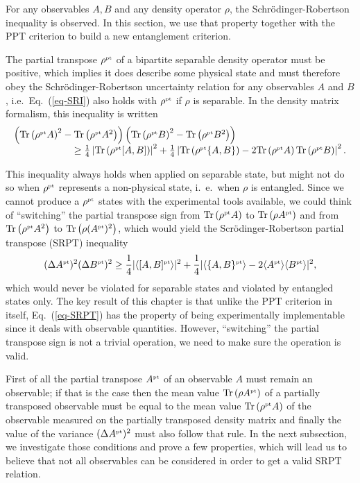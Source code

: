 For any observables $A, B$ and any density operator $\rho$, the Schr\"odinger-Robertson inequality is observed. In this section, we use that property together with the PPT criterion to build a new entanglement criterion.

The partial transpose $\rho^{\mbox{\tiny \textup{pt}}}$ of a bipartite separable density operator must be positive, which implies it does describe some physical state and must therefore obey the Schr\"odinger-Robertson uncertainty relation for any observables $A$ and $B$, i.e.~Eq.~(\ref{eq-SRI}) also holds with $\rho^{\mbox{\tiny \textup{pt}}}$ if $\rho$ is separable. In the density matrix formalism, this inequality is written
\[ \begin{array}{c}
    \left( \tr{\pt \rho A}^2 - \tr{\pt \rho A^2} \right) \left( \tr{\pt \rho B}^2 - \tr{\pt \rho B^2} \right)  \hspace{4cm} \\  \hfill \ge \frac 1 4 \left| \tr{\pt\rho [A,B]} \right|^2+\frac 1 4 \left| \tr{\pt\rho \{A,B\}} - 2  \tr{\pt \rho A} \tr{\pt \rho B}\right|^2.
  \end{array}\]

This inequality always holds when applied on separable state, but might not do so when $\rho^{\mbox{\tiny \textup{pt}}}$ represents a non-physical state, i.~e.~when $\rho$ is entangled. Since we cannot produce a $\rho^{\mbox{\tiny \textup{pt}}}$ states with the experimental tools available, we could think of ``switching'' the partial transpose sign from $ \mbox{\textup{Tr}}\left( \rho^{\mbox{\tiny \textup{pt}}} A \right)$ to $ \mbox{\textup{Tr}}\left(  \rho A^{\mbox{\tiny \textup{pt}}} \right)$ and from $\mbox{\textup{Tr}}\left( \rho^{\mbox{\tiny \textup{pt}}} A^2 \right)$ to $\mbox{\textup{Tr}}\left(  \rho (A^{\mbox{\tiny \textup{pt}}})^2 \right)$, which would yield the Scr\"odinger-Robertson partial transpose (SRPT) inequality
\[  (\Delta A^{\mbox{\tiny \textup{pt}}})^2 (\Delta B^{\mbox{\tiny \textup{pt}}})^2 \ge \frac{1}{4} | \langle [A,B]^{\mbox{\tiny \textup{pt}}} \rangle |^2  +  \frac{1}{4} | \langle \{ A,B \}^{\mbox{\tiny \textup{pt}}} \rangle  - 2 \langle A^{\mbox{\tiny \textup{pt}}} \rangle \langle B^{\mbox{\tiny \textup{pt}}} \rangle |^2 , \label{eq-SRPT} \]
which would never be violated for separable states and violated by entangled states only. The key result of this chapter is that unlike the PPT criterion in itself, Eq.~(\ref{eq-SRPT}) has the property of being experimentally implementable since it deals with observable quantities. However, ``switching'' the partial transpose sign is not a trivial operation, we need to make sure the operation is valid.

First of all the partial transpose $A^{\mbox{\tiny \textup{pt}}}$ of an observable $A$ must remain an observable; if that is the case then the mean value $ \mbox{\textup{Tr}}\left( \rho A^{\mbox{\tiny \textup{pt}}} \right)$ of a partially transposed observable must be equal to the mean value $ \mbox{\textup{Tr}}\left( \rho^{\mbox{\tiny \textup{pt}}} A \right)$ of the observable measured on the partially transposed density matrix and finally the value of the variance $(\Delta A^{\mbox{\tiny \textup{pt}}})^2$ must also follow that rule. In the next subsection, we investigate those conditions and prove a few properties, which will lead us to believe that not all observables can be considered in order to get a valid SRPT relation.

